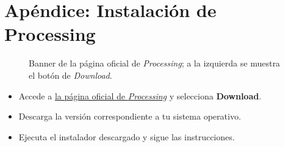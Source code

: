 \documentclass[
  spanish,
  11pt,
  a4paper,
  DIV=11,
  numbers=noendperiod]{scrartcl}
\providecommand{\tightlist}{%
  \setlength{\itemsep}{0pt}\setlength{\parskip}{0pt}}
\begin{document}
\section*{Apéndice: Instalación de Processing}

\label{apéndice-instalación-de-processing}

\begin{figure}

\caption{\label{fig-installation}Banner de la página oficial de \emph{Processing}; a la izquierda se muestra el botón de \emph{Download}.}

\end{figure}%

\begin{itemize}
\tightlist
\item
  Accede a \href{http://processing.org}{la página oficial de \emph{Processing}} y selecciona \textbf{Download}.
\item
  Descarga la versión correspondiente a tu sistema operativo.
\item
  Ejecuta el instalador descargado y sigue las instrucciones.
\end{itemize}
\end{document}

